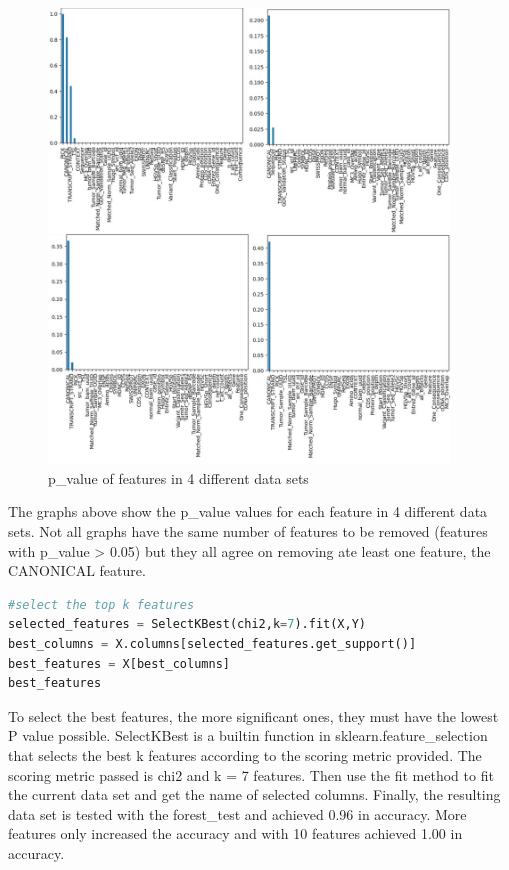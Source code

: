 \begin{figure}[h]
    \centering
    \includegraphics[width=0.95\textwidth,height=0.55\textheight]{Chapters/Figures/chi_square_test.jpg}
    \caption{p\_value of features in 4 different data sets}
    \label{fig:chi_graph}
\end{figure}

The graphs above show the p\_value values for each feature in 4 different data sets. Not all graphs have the same number of features to be removed (features with p\_value > 0.05) but they all agree on removing ate least one feature, the CANONICAL feature.

\begin{lstlisting}[language=Python]
#select the top k features
selected_features = SelectKBest(chi2,k=7).fit(X,Y)
best_columns = X.columns[selected_features.get_support()]
best_features = X[best_columns]
best_features
\end{lstlisting}

To select the best features, the more significant ones, they must have the lowest P value possible. SelectKBest is a builtin function in sklearn.feature\_selection that selects the best k features according to the scoring metric provided. The scoring metric passed is chi2 and k = 7 features. Then use the fit method to fit the current data set and get the name of selected columns. Finally, the resulting data set is tested with the forest\_test and achieved 0.96 in accuracy. More features only increased the accuracy and with 10 features achieved 1.00 in accuracy.


